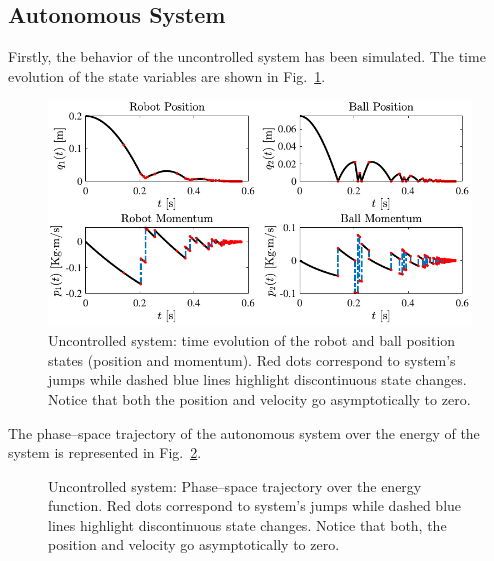 %
%
\subsection{Autonomous System}
%
Firstly, the behavior of the uncontrolled system has been simulated. The time evolution of the state variables are shown in Fig.~\ref{fig:aut1}.
%
\begin{figure}[ht!]
	\centering
	\includegraphics[width = \linewidth]{Figures/aut1.pdf}
	\caption[Uncontrolled system: time evolution of the robot and ball position states]{Uncontrolled system: time evolution of the robot and ball position states (position and momentum). Red dots correspond to system's jumps while dashed blue lines highlight discontinuous state changes. Notice that both the position and velocity go asymptotically to zero.}
	\label{fig:aut1}
\end{figure}
%
The phase--space trajectory of the autonomous system over the energy of the system is represented in Fig.~\ref{fig:aut2}. 
%
\begin{figure}[hb!]
	\centering
	
	\caption[Uncontrolled system: Phase--space trajectory over the energy function]{Uncontrolled system: Phase--space trajectory over the energy function. Red dots correspond to system's jumps while dashed blue lines highlight discontinuous state changes. Notice that both, the position and velocity go asymptotically to zero.}
	\label{fig:aut2}
\end{figure}

